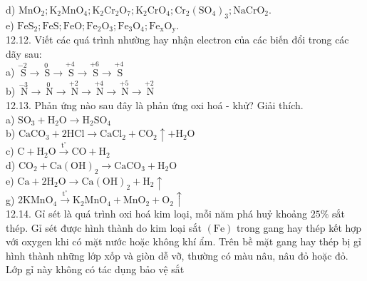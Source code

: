 \documentclass[10pt]{article}
\begin{document}
d) $\mathrm{MnO}_{2} ; \mathrm{K}_{2} \mathrm{MnO}_{4} ; \mathrm{K}_{2} \mathrm{Cr}_{2} \mathrm{O}_{7} ; \mathrm{K}_{2} \mathrm{CrO}_{4} ; \mathrm{Cr}_{2}\left(\mathrm{SO}_{4}\right)_{3} ; \mathrm{NaCrO}_{2}$.\\
e) $\mathrm{FeS}_{2} ; \mathrm{FeS} ; \mathrm{FeO} ; \mathrm{Fe}_{2} \mathrm{O}_{3} ; \mathrm{Fe}_{3} \mathrm{O}_{4} ; \mathrm{Fe}_{\mathrm{x}} \mathrm{O}_{\mathrm{y}}$.\\
12.12. Viết các quá trình nhường hay nhận electron của các biến đổi trong các dãy sau:\\
a) $\stackrel{-2}{\mathrm{~S}} \rightarrow \stackrel{0}{\mathrm{~S}} \rightarrow \stackrel{+4}{\mathrm{~S}} \rightarrow \stackrel{+6}{\mathrm{~S}} \rightarrow \stackrel{+4}{\mathrm{~S}}$\\
b) $\stackrel{-3}{\mathrm{~N}} \rightarrow \stackrel{0}{\mathrm{~N}} \rightarrow \stackrel{+2}{\mathrm{~N}} \rightarrow \stackrel{+4}{\mathrm{~N}} \rightarrow \stackrel{+5}{\mathrm{~N}} \rightarrow \stackrel{+2}{\mathrm{~N}}$\\
12.13. Phản ứng nào sau đây là phản ứng oxi hoá - khử? Giải thích.\\
a) $\mathrm{SO}_{3}+\mathrm{H}_{2} \mathrm{O} \rightarrow \mathrm{H}_{2} \mathrm{SO}_{4}$\\
b) $\mathrm{CaCO}_{3}+2 \mathrm{HCl} \rightarrow \mathrm{CaCl}_{2}+\mathrm{CO}_{2} \uparrow+\mathrm{H}_{2} \mathrm{O}$\\
c) $\mathrm{C}+\mathrm{H}_{2} \mathrm{O} \xrightarrow{\mathrm{t}^{\circ}} \mathrm{CO}+\mathrm{H}_{2}$\\
d) $\mathrm{CO}_{2}+\mathrm{Ca}(\mathrm{OH})_{2} \rightarrow \mathrm{CaCO}_{3}+\mathrm{H}_{2} \mathrm{O}$\\
e) $\mathrm{Ca}+2 \mathrm{H}_{2} \mathrm{O} \rightarrow \mathrm{Ca}(\mathrm{OH})_{2}+\mathrm{H}_{2} \uparrow$\\
g) $2 \mathrm{KMnO}_{4} \xrightarrow{\mathrm{t}^{\circ}} \mathrm{K}_{2} \mathrm{MnO}_{4}+\mathrm{MnO}_{2}+\mathrm{O}_{2} \uparrow$\\
12.14. Gỉ sét là quá trình oxi hoá kim loại, mỗi năm phá huỷ khoảng $25 \%$ sắt thép. Gỉ sét được hình thành do kim loại sắt $(\mathrm{Fe})$ trong gang hay thép kết hợp với oxygen khi có mặt nước hoặc không khí ẩm. Trên bề mặt gang hay thép bị gỉ hình thành những lớp xốp và giòn dễ vỡ, thường có màu nâu, nâu đỏ hoặc đỏ. Lớp gỉ này không có tác dụng bảo vệ sắt
\end{document}
